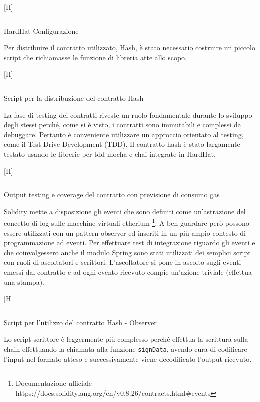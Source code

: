 \documentclass[a4paper,11pt]{article}
\newenvironment{longlisting}{\captionsetup{type=figure,labelformat=custom}}{}
\begin{document}
\begin{longlisting}[H]
  \inputminted{typescript}{./code/hardhat.config.ts}
  \caption{HardHat Configurazione}
  \label{listing:hardhatconf}
\end{longlisting}

Per distribuire il contratto utilizzato, Hash, è stato necessario costruire un piccolo script che richiamasse le funzione di libreria atte allo scopo.

\begin{longlisting}[H]
  \inputminted{typescript}{./code/hash.deploy.ts}
  \caption{Script per la distribuzione del contratto Hash}
  \label{listing:hash4}
\end{longlisting}

La fase di testing dei contratti riveste un ruolo fondamentale durante lo sviluppo degli stessi perché, come si è visto, i contratti sono immutabili e complessi da debuggare. Pertanto è conveniente utilizzare un approccio orientato al testing, come il Test Drive Development (TDD). Il contratto hash è stato largamente testato usando le librerie per tdd mocha e chai integrate in HardHat.

\begin{longlisting}[H]
  \inputminted{bash}{./code/coverage.sh}
  \caption{Output testing e coverage del contratto con previsione di consumo gas}
  \label{listing:hashxx}
\end{longlisting}

Solidity mette a disposizione gli eventi che sono definiti come un'astrazione del concetto di log sulle macchine virtuali etherium \footnote{Documentazione ufficiale https://docs.soliditylang.org/en/v0.8.26/contracts.html\#events}. A ben guardare però possono essere utilizzati con un pattern observer ed inseriti in un più ampio contesto di programmazione ad eventi. Per effettuare test di integrazione riguardo gli eventi e che coinvolgessero anche il modulo Spring sono stati utilizzati dei semplici script con ruoli di ascoltatori e scrittori. L'ascoltatore si pone in ascolto sugli eventi emessi dal contratto e ad ogni evento ricevuto compie un'azione triviale (effettua una stampa).

\begin{longlisting}[H]
  \inputminted{typescript}{./code/hash.listener.ts}
  \caption{Script per l'utilizzo del contratto Hash - Observer}
  \label{listing:hash5}
\end{longlisting}

Lo script scrittore è leggermente più complesso perché effettua la scrittura sulla chain effettuando la chiamata alla funzione \texttt{signData}, avendo cura di codificare l'input nel formato atteso e successivamente viene decodificato l'output ricevuto.
\end{document}
